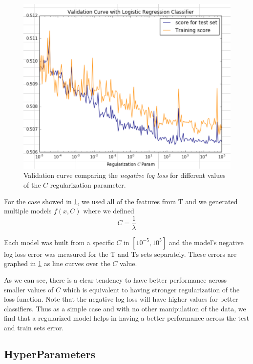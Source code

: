 \begin{figure}[h!]
\begin{center}
\includegraphics[width=0.7\columnwidth]{figures/regularization/figure-log_loss_error_validation_curve.png}
\caption{ Validation curve comparing the \textit{negative log loss} for different values of the $C$ regularization parameter.}
\label{fig:log_loss_regularization_validation_curve}
\end{center}
\end{figure}

For the case  showed in \cref{fig:log_loss_regularization_validation_curve}, we used all of the features from $\mathrm{T}$ and we generated multiple models $f(x,C)$ where we defined
$$C = \frac{1}{\lambda}$$

Each model was built from a specific $C$ in  $[10^{-5},10^5]$  and the model's negative log loss error was measured for the $\mathrm{T}$ and $\mathrm{Ts}$ sets separately. These errors are graphed in \cref{fig:log_loss_regularization_validation_curve} as line curves over the $C$ value.

As we can see, there is a clear tendency to have better performance across smaller values of $C$ which is equivalent to having stronger regularization of the loss function. Note that the negative log loss will have higher values for better classifiers. Thus as a simple case and with no other manipulation of the data, we find that a regularized model helps in having a better performance across the test and train sets error.



\subsection{HyperParameters}



